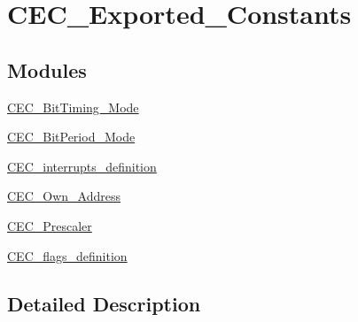 \hypertarget{group___c_e_c___exported___constants}{}\section{C\+E\+C\+\_\+\+Exported\+\_\+\+Constants}
\label{group___c_e_c___exported___constants}
\subsection*{Modules}
\begin{DoxyCompactItemize}
\item 
\mbox{\hyperlink{group___c_e_c___bit_timing___mode}{C\+E\+C\+\_\+\+Bit\+Timing\+\_\+\+Mode}}
\item 
\mbox{\hyperlink{group___c_e_c___bit_period___mode}{C\+E\+C\+\_\+\+Bit\+Period\+\_\+\+Mode}}
\item 
\mbox{\hyperlink{group___c_e_c__interrupts__definition}{C\+E\+C\+\_\+interrupts\+\_\+definition}}
\item 
\mbox{\hyperlink{group___c_e_c___own___address}{C\+E\+C\+\_\+\+Own\+\_\+\+Address}}
\item 
\mbox{\hyperlink{group___c_e_c___prescaler}{C\+E\+C\+\_\+\+Prescaler}}
\item 
\mbox{\hyperlink{group___c_e_c__flags__definition}{C\+E\+C\+\_\+flags\+\_\+definition}}
\end{DoxyCompactItemize}


\subsection{Detailed Description}

